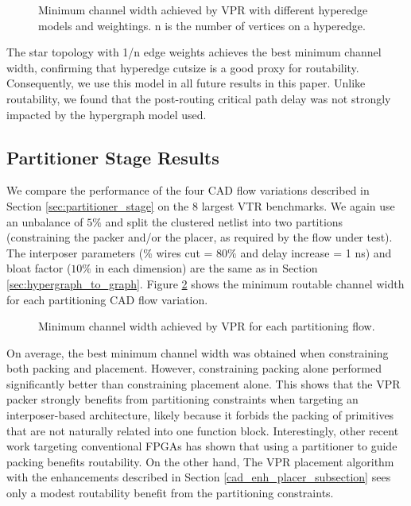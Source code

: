 \begin{figure}[!htbp]
\centering

\caption{Minimum channel width achieved by VPR with different hyperedge models and weightings. n is the number of vertices on a hyperedge.}
\label{fig:graph_topology_mcw}
\end{figure}

The star topology with 1/n edge weights achieves the best minimum channel width, confirming that hyperedge cutsize is a good proxy for routability. Consequently, we use this model in all future results in this paper. Unlike routability, we found that the post-routing critical path delay was not strongly impacted by the hypergraph model used.

\subsection{Partitioner Stage Results}\label{sec:partitioner_stage_results}
We compare the performance of the four CAD flow variations described in Section \ref{sec:partitioner_stage} on the 8 largest VTR benchmarks. We again use an unbalance of $5\%$ and split the clustered netlist into two partitions (constraining the packer and/or the placer, as required by the flow under test). The interposer parameters (\% wires cut = $80\%$ and delay increase = 1 ns) and bloat factor ($10\%$ in each dimension) are the same as in Section \ref{sec:hypergraph_to_graph}. Figure \ref{fig:flows_mcw} shows the minimum routable channel width for each partitioning CAD flow variation.

\begin{figure}[!htbp]
\centering

\caption{Minimum channel width achieved by VPR for each partitioning flow.}
\label{fig:flows_mcw}
\end{figure}

On average, the best minimum channel width was obtained when constraining both packing and placement. However, constraining packing alone performed significantly better than constraining placement alone. This shows that the VPR packer strongly benefits from partitioning constraints when targeting an interposer-based architecture, likely because it forbids the packing of primitives that are not naturally related into one function block. Interestingly, other recent work targeting conventional FPGAs has shown that using a partitioner to guide packing benefits routability\cite{feng2014rent}. On the other hand, The VPR placement algorithm with the enhancements described in Section \ref{cad_enh_placer_subsection} sees only a modest routability benefit from the partitioning constraints.

